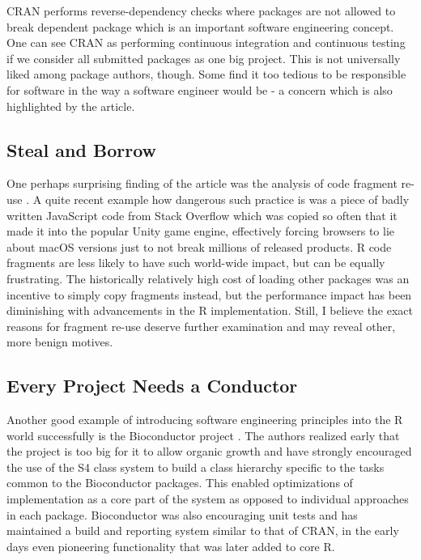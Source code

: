 CRAN performs reverse-dependency checks where packages are not allowed
to break dependent package which is an important software engineering
concept. One can see CRAN as performing continuous integration and
continuous testing if we consider all submitted packages as one big
project. This is not universally liked among package authors, though.
Some find it too tedious to be responsible for software in the way a
software engineer would be - a concern which is also highlighted by the
article.

\hypertarget{steal-and-borrow}{%
\subsection{Steal and Borrow}\label{steal-and-borrow}}

One perhaps surprising finding of the article was the analysis of code
fragment re-use \citep{clones}. A quite recent example how dangerous
such practice is was a piece of badly written JavaScript code from Stack
Overflow \citep{SO} which was copied so often that it made it into the
popular Unity game engine, effectively forcing browsers to lie about
macOS versions \citep{chromium} just to not break millions of released
products. R code fragments are less likely to have such world-wide
impact, but can be equally frustrating. The historically relatively high
cost of loading other packages was an incentive to simply copy fragments
instead, but the performance impact has been diminishing with
advancements in the R implementation. Still, I believe the exact reasons
for fragment re-use deserve further examination and may reveal other,
more benign motives.

\hypertarget{every-project-needs-a-conductor}{%
\subsection{Every Project Needs a
Conductor}\label{every-project-needs-a-conductor}}

Another good example of introducing software engineering principles into
the R world successfully is the Bioconductor project \citep{BioC}. The
authors realized early that the project is too big for it to allow
organic growth and have strongly encouraged the use of the S4 class
system to build a class hierarchy specific to the tasks common to the
Bioconductor packages. This enabled optimizations of implementation as a
core part of the system as opposed to individual approaches in each
package. Bioconductor was also encouraging unit tests and has maintained
a build and reporting system similar to that of CRAN, in the early days
even pioneering functionality that was later added to core R.

